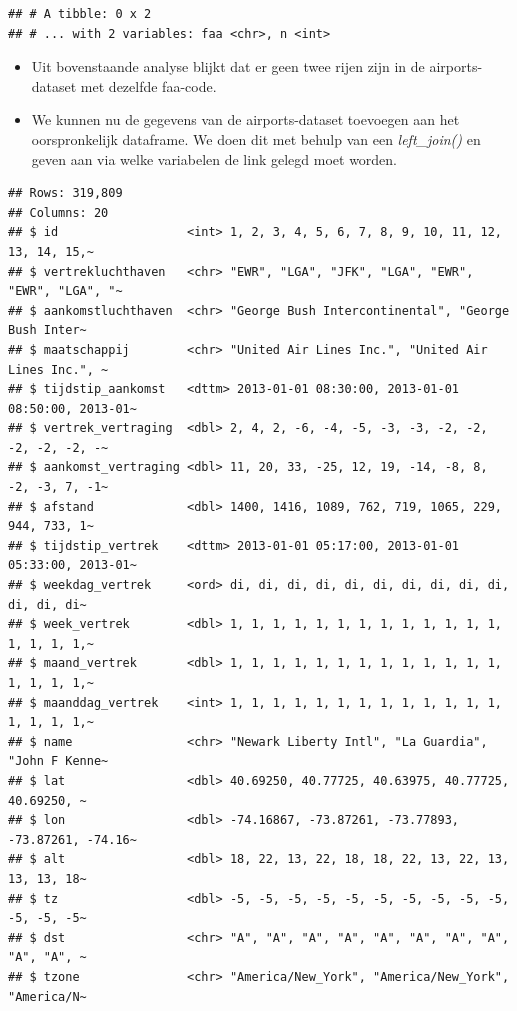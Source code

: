 \documentclass[]{tufte-book}
\providecommand{\tightlist}{%
  \setlength{\itemsep}{0pt}\setlength{\parskip}{0pt}}
\begin{document}
\begin{verbatim}
## # A tibble: 0 x 2
## # ... with 2 variables: faa <chr>, n <int>
\end{verbatim}

\begin{itemize}
\tightlist
\item
  Uit bovenstaande analyse blijkt dat er geen twee rijen zijn in de airports-dataset met dezelfde faa-code.
\item
  We kunnen nu de gegevens van de airports-dataset toevoegen aan het oorspronkelijk dataframe. We doen dit met behulp van een \emph{left\_join()} en geven aan via welke variabelen de link gelegd moet worden.
\end{itemize}

\begin{verbatim}
## Rows: 319,809
## Columns: 20
## $ id                  <int> 1, 2, 3, 4, 5, 6, 7, 8, 9, 10, 11, 12, 13, 14, 15,~
## $ vertrekluchthaven   <chr> "EWR", "LGA", "JFK", "LGA", "EWR", "EWR", "LGA", "~
## $ aankomstluchthaven  <chr> "George Bush Intercontinental", "George Bush Inter~
## $ maatschappij        <chr> "United Air Lines Inc.", "United Air Lines Inc.", ~
## $ tijdstip_aankomst   <dttm> 2013-01-01 08:30:00, 2013-01-01 08:50:00, 2013-01~
## $ vertrek_vertraging  <dbl> 2, 4, 2, -6, -4, -5, -3, -3, -2, -2, -2, -2, -2, -~
## $ aankomst_vertraging <dbl> 11, 20, 33, -25, 12, 19, -14, -8, 8, -2, -3, 7, -1~
## $ afstand             <dbl> 1400, 1416, 1089, 762, 719, 1065, 229, 944, 733, 1~
## $ tijdstip_vertrek    <dttm> 2013-01-01 05:17:00, 2013-01-01 05:33:00, 2013-01~
## $ weekdag_vertrek     <ord> di, di, di, di, di, di, di, di, di, di, di, di, di~
## $ week_vertrek        <dbl> 1, 1, 1, 1, 1, 1, 1, 1, 1, 1, 1, 1, 1, 1, 1, 1, 1,~
## $ maand_vertrek       <dbl> 1, 1, 1, 1, 1, 1, 1, 1, 1, 1, 1, 1, 1, 1, 1, 1, 1,~
## $ maanddag_vertrek    <int> 1, 1, 1, 1, 1, 1, 1, 1, 1, 1, 1, 1, 1, 1, 1, 1, 1,~
## $ name                <chr> "Newark Liberty Intl", "La Guardia", "John F Kenne~
## $ lat                 <dbl> 40.69250, 40.77725, 40.63975, 40.77725, 40.69250, ~
## $ lon                 <dbl> -74.16867, -73.87261, -73.77893, -73.87261, -74.16~
## $ alt                 <dbl> 18, 22, 13, 22, 18, 18, 22, 13, 22, 13, 13, 13, 18~
## $ tz                  <dbl> -5, -5, -5, -5, -5, -5, -5, -5, -5, -5, -5, -5, -5~
## $ dst                 <chr> "A", "A", "A", "A", "A", "A", "A", "A", "A", "A", ~
## $ tzone               <chr> "America/New_York", "America/New_York", "America/N~
\end{verbatim}
\end{document}
